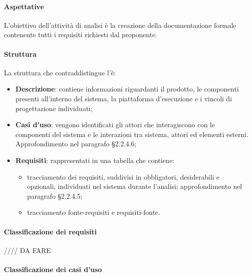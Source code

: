 \paragraph{Aspettative}

L'obiettivo dell'attività di analisi è la creazione della documentazione formale contenente tutti i requisiti richiesti dal proponente.

\paragraph{Struttura}

La struttura che contraddistingue l'\AdR  è:
\begin{itemize}

\item \textbf{Descrizione}: contiene informazioni riguardanti il prodotto,  le componenti presenti all'interno del sistema,  la piattaforma d'esecuzione e i vincoli di progettazione individuati;

\item \textbf{Casi d'uso}: vengono identificati gli attori che interagiscono con le componenti del sistema e le interazioni tra sistema,  attori ed elementi esterni.  Approfondimento nel paragrafo §2.2.4.6;
\item \textbf{Requisiti}: rappresentati in una tabella che contiene:
 \begin{itemize}
 
 \item tracciamento dei requisiti,  suddivisi in obbligatori,  desiderabili e opzionali,  individuati nel sistema durante l'analisi; approfondimento nel paragrafo §2.2.4.5;
 
 \item tracciamento fonte-requisiti e requisiti-fonte.
 
 \end{itemize}

\end{itemize}

\paragraph{Classificazione dei requisiti}

//// DA FARE

\paragraph{Classificazione dei casi d'uso}

